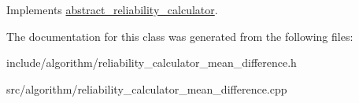 Implements \hyperlink{classabstract__reliability__calculator_a4457d3eece3c873e2cc2455a6dfdbb88}{abstract\-\_\-reliability\-\_\-calculator}.



The documentation for this class was generated from the following files\-:\begin{DoxyCompactItemize}
\item 
include/algorithm/reliability\-\_\-calculator\-\_\-mean\-\_\-difference.\-h\item 
src/algorithm/reliability\-\_\-calculator\-\_\-mean\-\_\-difference.\-cpp\end{DoxyCompactItemize}
